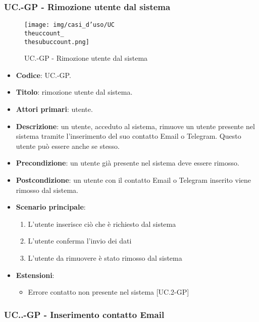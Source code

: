 	\subsubsection{UC\theuccount.\thesubuccount-GP - Rimozione utente dal sistema}
		\begin{figure}[H]
			\centering
			\texttt{[image: img/casi\_d'uso/UC\\theuccount\_\\thesubuccount.png]}\\
			\caption{UC\theuccount.\thesubuccount-GP - Rimozione utente dal sistema}
		\end{figure}
		\begin{itemize}
			\item \textbf{Codice}: UC\theuccount.\thesubuccount-GP.
			\item \textbf{Titolo}: rimozione utente dal sistema.
			\item \textbf{Attori primari}: utente.
			\item \textbf{Descrizione}: un utente, acceduto al sistema, rimuove un utente presente nel sistema tramite l'inserimento del suo contatto Email o Telegram. Questo utente può essere anche se stesso.
			\item \textbf{Precondizione}: un utente già presente nel sistema deve essere rimosso.
			\item \textbf{Postcondizione}: un utente con il contatto Email o Telegram inserito viene rimosso dal sistema.
			\item \textbf{Scenario principale}:
			\begin{enumerate}
				\item L'utente inserisce ciò che è richiesto dal sistema
				\item L'utente conferma l'invio dei dati
				\item L'utente da rimuovere è stato rimosso dal sistema
			\end{enumerate}
			\item \textbf{Estensioni}:
			\begin{itemize}
				\item Errore contatto non presente nel sistema [UC\theuccount.2-GP]
			\end{itemize}
		\end{itemize}

			\subsubsection{UC\theuccount.\thesubuccount.\thesubsubuccount-GP - Inserimento contatto Email}

